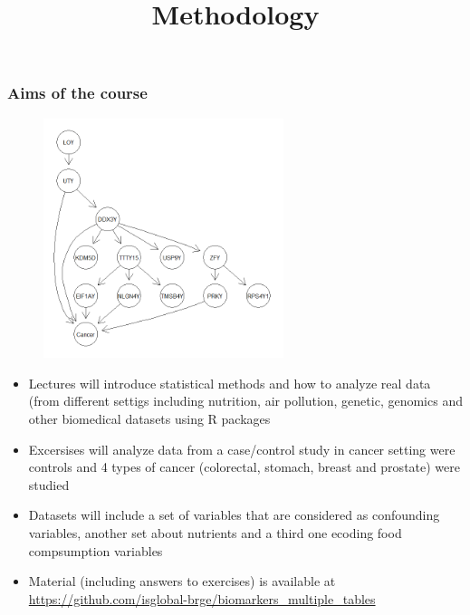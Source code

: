 \documentclass[10pt,xcolor=dvipsnames]{beamer}\usepackage[]{graphicx}\usepackage[]{color}
\begin{document}
\begin{frame}\frametitle{Aims of the course}

\begin{figure}
\begin{center}
 \includegraphics[height=7cm, width=7cm]{figures/step4.png}
\end{center}
\end{figure}

\end{frame}



\begin{frame}\title{Methodology}
 \begin{itemize}
  \item Lectures will introduce statistical methods and how to analyze real data (from different settigs including nutrition, air pollution, genetic, genomics and other biomedical datasets using R packages
  \item Excersises will analyze data from a case/control study in cancer setting were controls and 4 types of cancer (colorectal, stomach, breast and prostate) were studied
  \item Datasets will include a set of variables that are considered as confounding variables, another set about nutrients and a third one ecoding food compsumption variables
  \item Material (including answers to exercises) is available at \url{https://github.com/isglobal-brge/biomarkers_multiple_tables}
 \end{itemize}
 \end{frame}
\end{document}
